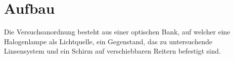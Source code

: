 \section{Aufbau}
\label{sec:Aufbau}

Die Versuchsanordnung besteht aus einer optischen Bank, auf welcher eine Halogenlampe als Lichtquelle, ein Gegenstand, das zu untersuchende Linsensystem und ein Schirm auf verschiebbaren Reitern befestigt sind.
